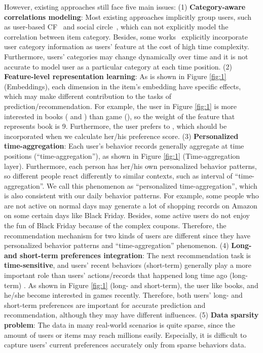 \documentclass[preprint,12pt]{elsarticle}
\begin{document}
\begin{sloppypar}
However, existing approaches still face five main issues: (1) \textbf{Category-aware correlations modeling}: Most existing approaches implicitly group users, such as user-based CF~\cite{chen2020deep, koohi2016user, bellogin2012using} and social circle~\cite{purushotham2012collaborative, qian2013personalized}, which can not explicitly model the correlation between item category. Besides, some works~\cite{papagelis2005qualitative, yang2012circle} explicitly incorporate user category information as users' feature at the cost of high time complexity. Furthermore, users' categories may change dynamically over time and it is not accurate to model user as a particular category at each time position. (2) \textbf{Feature-level representation learning}: As is shown in Figure \ref{fig:1} (Embeddings), each dimension in the item's embedding have specific effects, which may make different contribution to the tasks of prediction/recommendation. For example, the user in Figure \ref{fig:1} is more interested in books ( and ) than game (), so the weight of the feature that represents book is 9. Furthermore, the user prefers  to , which should be incorporated when we calculate her/his preference score. (3) \textbf{Personalized time-aggregation}: Each user's behavior records generally aggregate at time positions (``time-aggregation''), as shown in Figure \ref{fig:1} (Time-aggregation layer). Furthermore, each person has her/his own personalized behavior patterns, so different people react differently to similar contexts, such as interval of ``time-aggregation''. We call this phenomenon as ``personalized time-aggregation'', which is also consistent with our daily behavior patterns. For example, some people who are not active on normal days may generate a lot of shopping records on Amazon on some certain days like Black Friday. Besides, some active users do not enjoy the fun of Black Friday because of the complex coupons. Therefore, the recommendation mechanism for two kinds of users are different since they have personalized behavior patterns and ``time-aggregation'' phenomenon.  (4) \textbf{Long- and short-term preferences integration}: The next recommendation task is \textbf {time-sensitive}, and users' recent behaviors (short-term) generally play a more important role than users' actions/records that happened long time ago (long-term) . As shown in Figure \ref{fig:1} (long- and short-term), the user like books, and he/she become interested in games recently. Therefore, both users' long- and short-term preferences are important for accurate prediction and recommendation, although they may have different influences.  (5) \textbf{Data sparsity problem}: The data in many real-world scenarios is quite sparse, since the amount of users or items may reach millions easily. Especially, it is difficult to capture users' current preferences accurately only from sparse behaviors data.


\end{sloppypar}
\end{document}
